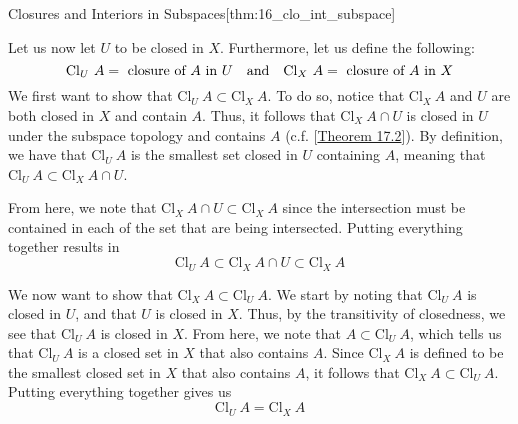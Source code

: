 \begin{thmBox}{Closures and Interiors in Subspaces}[thm:16_clo_int_subspace]
\begin{proofBox}
        \baseSkip

        Let us now let \( U \) to be closed in \( X \).
        Furthermore, let us define the following:
        \begin{equation*}
            \mathrm{Cl}_{ U } \ A
            =
            \text{ closure of \( A \) in \( U \)}
            \quad \mathrm{and} \quad 
            \mathrm{Cl}_{ X } \ A
            =
            \text{ closure of \( A \) in \( X \)}
        \end{equation*}
        We first want to show that \( \mathrm{Cl}_{ U } \ A \subset 
        \mathrm{Cl}_{ X } \ A \).
        To do so, notice that \( \mathrm{Cl}_{ X } \ A \) and \( U \) are both 
        closed in \( X \) and contain \( A \). 
        Thus, it follows that \( \mathrm{Cl}_{ X } \ A \cap U \) is closed in 
        \( U \) under the subspace topology and contains \( A \)
        (c.f. [\hyperlink{thm:17.4}{Theorem 17.2}]).
        By definition, we have that \( \mathrm{Cl}_{ U } \ A \) is the smallest
        set closed in \( U \) containing \( A \), meaning that 
        \( \mathrm{Cl}_{ U } \ A \subset \mathrm{Cl}_{ X } \ A \cap U \).
        
        \baseSkip

        From here, we note that \( \mathrm{Cl}_{ X } \ A \cap U \subset 
        \mathrm{Cl}_{ X } \ A \) since the intersection must be contained in 
        each of the set that are being intersected.
        Putting everything together results in
        \begin{equation*}
            \mathrm{Cl}_{ U } \ A 
            \subset 
            \mathrm{Cl}_{ X } \ A \cap U 
            \subset 
            \mathrm{Cl}_{ X } \ A
        \end{equation*}

        \baseSkip 

        We now want to show that \( \mathrm{Cl}_{ X } \ A \subset 
        \mathrm{Cl}_{ U } \ A \).
        We start by noting that \( \mathrm{Cl}_{ U } \ A \) is closed in 
        \( U \), and that \( U \) is closed in \( X \).
        Thus, by the transitivity of closedness, we see that 
        \( \mathrm{Cl}_{ U } \ A \) is closed in \( X \).
        From here, we note that \( A \subset \mathrm{Cl}_{ U } \ A \), which 
        tells us that \( \mathrm{Cl}_{ U } \ A \) is a closed set in \( X \)
        that also contains \( A \).
        Since \( \mathrm{Cl}_{ X } \ A \) is defined to be the smallest closed 
        set in \( X \) that also contains \( A \), it follows that 
        \( \mathrm{Cl}_{ X } \ A \subset \mathrm{Cl}_{ U } \ A \).
        Putting everything together gives us
        \begin{equation*}
            \mathrm{Cl}_{ U } \ A
            =
            \mathrm{Cl}_{ X } \ A
        \end{equation*}

    \end{proofBox}
\end{thmBox}